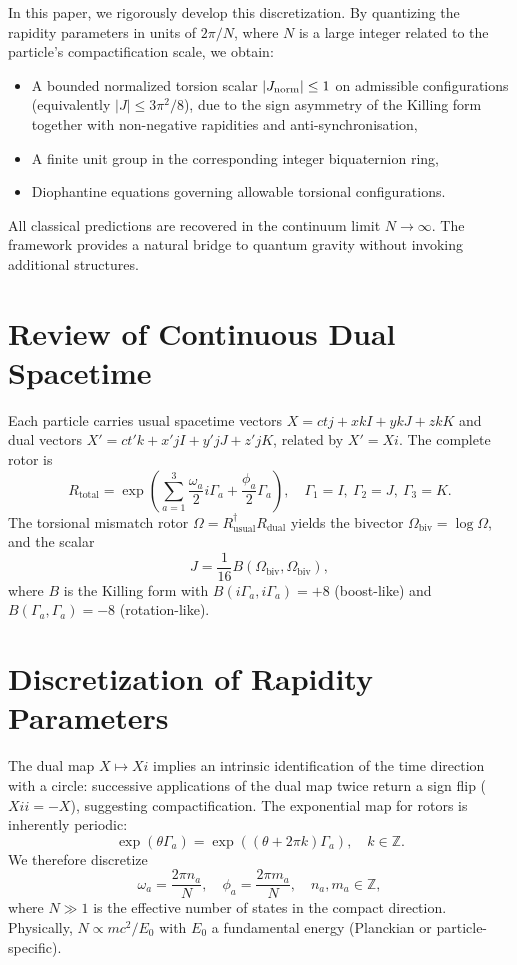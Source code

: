 \documentclass[dvipdfmx,11pt,a4paper]{article}
\newcommand{\Jnorm}{J_{\rm norm}}
\begin{document}
In this paper, we rigorously develop this discretization. By quantizing the rapidity parameters in units of $2\pi/N$, where $N$ is a large integer related to the particle's compactification scale, we obtain:
\begin{itemize}
  \item A bounded normalized torsion scalar $|\Jnorm| \leq 1$ on admissible configurations (equivalently $|J| \leq 3\pi^2/8$), due to the sign asymmetry of the Killing form together with non-negative rapidities and anti-synchronisation,
  \item A finite unit group in the corresponding integer biquaternion ring,
  \item Diophantine equations governing allowable torsional configurations.
\end{itemize}
All classical predictions are recovered in the continuum limit $N \to \infty$. The framework provides a natural bridge to quantum gravity without invoking additional structures.

\section{Review of Continuous Dual Spacetime}
\label{sec:review}

Each particle carries usual spacetime vectors $X = ct j + x kI + y kJ + z kK$ and dual vectors $X' = ct' k + x' jI + y' jJ + z' jK$, related by $X' = Xi$. The complete rotor is
\[
R_\text{total} = \exp\left( \sum_{a=1}^3 \frac{\omega_a}{2} i\Gamma_a + \frac{\phi_a}{2} \Gamma_a \right), \quad \Gamma_1 = I,\ \Gamma_2 = J,\ \Gamma_3 = K.
\]
The torsional mismatch rotor $\Omega = R_\text{usual}^\dagger R_\text{dual}$ yields the bivector $\Omega_\text{biv} = \log \Omega$, and the scalar
\[
J = \frac{1}{16} B(\Omega_\text{biv}, \Omega_\text{biv}),
\]
where $B$ is the Killing form with $B(i\Gamma_a, i\Gamma_a) = +8$ (boost-like) and $B(\Gamma_a, \Gamma_a) = -8$ (rotation-like).

\section{Discretization of Rapidity Parameters}
\label{sec:discretization}

The dual map $X \mapsto Xi$ implies an intrinsic identification of the time direction with a circle: successive applications of the dual map twice return a sign flip ($Xi i = -X$), suggesting compactification. The exponential map for rotors is inherently periodic:
\[
\exp(\theta \Gamma_a) = \exp((\theta + 2\pi k) \Gamma_a), \quad k \in \mathbb{Z}.
\]
We therefore discretize
\[
\omega_a = \frac{2\pi n_a}{N}, \quad \phi_a = \frac{2\pi m_a}{N}, \quad n_a, m_a \in \mathbb{Z},
\]
where $N \gg 1$ is the effective number of states in the compact direction. Physically, $N \propto m c^2 / E_0$ with $E_0$ a fundamental energy (Planckian or particle-specific).
\end{document}
